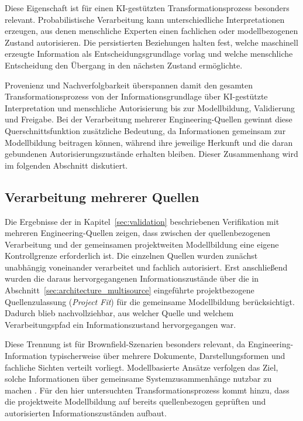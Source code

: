 Diese Eigenschaft ist für einen KI-gestützten Transformationsprozess
besonders relevant. Probabilistische Verarbeitung kann unterschiedliche
Interpretationen erzeugen, aus denen menschliche Experten einen fachlichen
oder modellbezogenen Zustand autorisieren. Die persistierten Beziehungen
halten fest, welche maschinell erzeugte Information als Entscheidungsgrundlage
vorlag und welche menschliche Entscheidung den Übergang in den nächsten
Zustand ermöglichte.

Provenienz und Nachverfolgbarkeit überspannen damit den gesamten
Transformationsprozess von der Informationsgrundlage über KI-gestützte
Interpretation und menschliche Autorisierung bis zur Modellbildung,
Validierung und Freigabe. Bei der Verarbeitung mehrerer Engineering-Quellen
gewinnt diese Querschnittsfunktion zusätzliche Bedeutung, da Informationen
gemeinsam zur Modellbildung beitragen können, während ihre jeweilige Herkunft
und die daran gebundenen Autorisierungszustände erhalten bleiben. Dieser
Zusammenhang wird im folgenden Abschnitt diskutiert.

\subsection{Verarbeitung mehrerer Quellen}
\label{sec:discussion_multisource}

Die Ergebnisse der in Kapitel~\ref{sec:validation} beschriebenen
Verifikation mit mehreren Engineering-Quellen zeigen, dass zwischen der
quellenbezogenen Verarbeitung und der gemeinsamen projektweiten Modellbildung
eine eigene Kontrollgrenze erforderlich ist. Die einzelnen Quellen wurden
zunächst unabhängig voneinander verarbeitet und fachlich autorisiert. Erst
anschließend wurden die daraus hervorgegangenen Informationszustände über die
in Abschnitt~\ref{sec:architecture_multisource} eingeführte
projektbezogene Quellenzulassung (\emph{Project Fit}) für die gemeinsame
Modellbildung berücksichtigt. Dadurch blieb nachvollziehbar, aus welcher
Quelle und welchem Verarbeitungspfad ein Informationszustand hervorgegangen
war.

Diese Trennung ist für Brownfield-Szenarien besonders relevant, da
Engineering-Information typischerweise über mehrere Dokumente,
Darstellungsformen und fachliche Sichten verteilt vorliegt. Modellbasierte
Ansätze verfolgen das Ziel, solche Informationen über gemeinsame
Systemzusammenhänge nutzbar zu machen
\cite{Hendriks2022,Zhao.2023}. Für den hier untersuchten
Transformationsprozess kommt hinzu, dass die projektweite Modellbildung auf
bereits quellenbezogen geprüften und autorisierten Informationszuständen
aufbaut.

